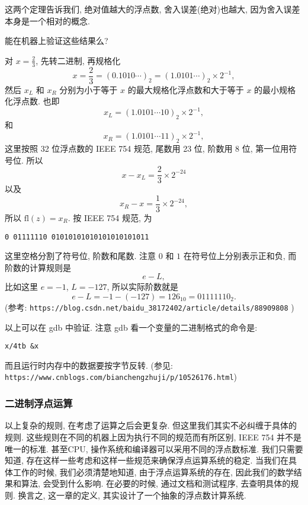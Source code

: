 \documentclass[a4paper]{ctexart}
\begin{document}
{这两个定理告诉我们, 绝对值越大的浮点数, 舍入误差(绝对)也越大, 
因为舍入误差本身是一个相对的概念.


 能在机器上验证这些结果么?

对 $x = \frac{2}{3}$, 先转二进制, 再规格化
$$
x = \frac{2}{3} = (0.1010\cdots)_2 = (1.0101\cdots)_2 \times 2^{-1},
$$
然后 $x_L$ 和 $x_R$ 分别为小于等于 $x$ 的最大规格化浮点数和大于等于
$x$ 的最小规格化浮点数. 也即
$$
x_L = (1.0101\cdots10)_2 \times 2^{-1},
$$
和
$$
x_R = (1.0101\cdots11)_2 \times 2^{-1},
$$
这里按照 32 位浮点数的 IEEE 754 规范, 尾数用 23 位, 阶数用 8 位, 第一位用符号位.
所以
$$
x - x_L = \frac{2}{3} \times 2^{-24}
$$
以及
$$
x_R - x = \frac{1}{3} \times 2^{-24},
$$
所以 $\mbox{fl}(z) = x_R$. 按 IEEE 754 规范, 为
\begin{verbatim}
0 01111110 01010101010101010101011
\end{verbatim}
这里空格分割了符号位, 阶数和尾数. 注意 $0$ 和 $1$ 在符号位上分别表示正和负,
而阶数的计算规则是
$$
e - L,
$$
比如这里 $e = -1$, $L = -127$, 所以实际阶数就是
$$
e - L = -1 - (-127) = 126_{10} = 01111110_2.
$$
(参考:\newline
\verb|https://blog.csdn.net/baidu_38172402/article/details/88909808|
)

以上可以在 gdb 中验证. 注意 gdb 看一个变量的二进制格式的命令是:
\begin{verbatim}
x/4tb &x
\end{verbatim}
而且运行时内存中的数据要按字节反转.
(参见: \newline
\verb|https://www.cnblogs.com/bianchengzhuji/p/10526176.html|)

\subsubsection{二进制浮点运算}
以上复杂的规则, 在考虑了运算之后会更复杂. 但这里我们其实不必纠缠于具体的规则.
这些规则在不同的机器上因为执行不同的规范而有所区别, IEEE 754 并不是唯一的标准.
甚至CPU, 操作系统和编译器可以采用不同的浮点数标准. 
我们只需要知道, 存在这样一些考虑和这样一些规范来确保浮点运算系统的稳定.
当我们在具体工作的时候, 我们必须清楚地知道, 由于浮点运算系统的存在,
因此我们的数学结果和算法, 会受到什么影响. 在必要的时候, 通过文档和测试程序,
去查明具体的规则. 换言之, 这一章的定义, 其实设计了一个抽象的浮点数计算系统.


}
\end{document}
